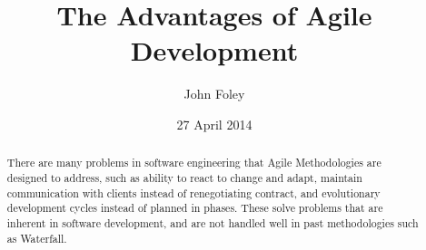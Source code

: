 \documentclass[11pt]{article}
\title{The Advantages of Agile Development}
\author{John Foley}
\date{27 April 2014}
\begin{document}
\maketitle

\thispagestyle{empty}

\begin{abstract}
  There are many
 problems in software engineering that Agile Methodologies are designed to address, such as ability to react to 
 change and adapt, maintain communication with clients instead of renegotiating contract, and evolutionary development cycles
 instead of planned in phases. These solve problems that are inherent in software development, and are not handled well in past
 methodologies such as Waterfall. 
\end{abstract}

\pagebreak
\end{document}
